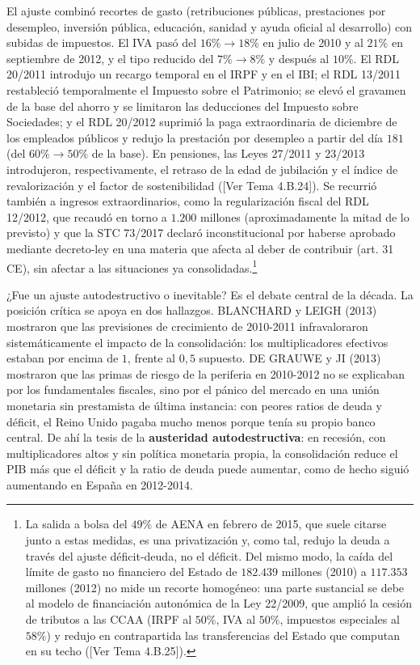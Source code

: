 \documentclass[10pt,a4paper]{article}
\newcommand{\authorfont}[1]{{\fontfamily{EBGaramond-TLF}\selectfont #1}}
\begin{document}
El ajuste combinó recortes de gasto (retribuciones públicas, prestaciones por desempleo, inversión pública, educación, sanidad y ayuda oficial al desarrollo) con subidas de impuestos. El IVA pasó del $16\%\to18\%$ en julio de 2010 y al $21\%$ en septiembre de 2012, y el tipo reducido del $7\%\to8\%$ y después al $10\%$. El RDL 20/2011 introdujo un recargo temporal en el IRPF y en el IBI; el RDL 13/2011 restableció temporalmente el Impuesto sobre el Patrimonio; se elevó el gravamen de la base del ahorro y se limitaron las deducciones del Impuesto sobre Sociedades; y el RDL 20/2012 suprimió la paga extraordinaria de diciembre de los empleados públicos y redujo la prestación por desempleo a partir del día $181$ (del $60\%\to50\%$ de la base). En pensiones, las Leyes 27/2011 y 23/2013 introdujeron, respectivamente, el retraso de la edad de jubilación y el índice de revalorización y el factor de sostenibilidad ([\authorfont{Ver Tema 4.B.24}]). Se recurrió también a ingresos extraordinarios, como la regularización fiscal del RDL 12/2012, que recaudó en torno a $1.200$ millones (aproximadamente la mitad de lo previsto) y que la STC 73/2017 declaró inconstitucional por haberse aprobado mediante decreto-ley en una materia que afecta al deber de contribuir (art. 31 CE), sin afectar a las situaciones ya consolidadas.\footnote{La salida a bolsa del $49\%$ de AENA en febrero de 2015, que suele citarse junto a estas medidas, es una privatización y, como tal, redujo la deuda a través del ajuste déficit-deuda, no el déficit. Del mismo modo, la caída del límite de gasto no financiero del Estado de $182.439$ millones (2010) a $117.353$ millones (2012) no mide un recorte homogéneo: una parte sustancial se debe al modelo de financiación autonómica de la Ley 22/2009, que amplió la cesión de tributos a las CCAA (IRPF al $50\%$, IVA al $50\%$, impuestos especiales al $58\%$) y redujo en contrapartida las transferencias del Estado que computan en su techo ([\authorfont{Ver Tema 4.B.25}]).
}

¿Fue un ajuste autodestructivo o inevitable? Es el debate central de la década. La posición crítica se apoya en dos hallazgos. BLANCHARD y LEIGH (2013) mostraron que las previsiones de crecimiento de 2010-2011 infravaloraron sistemáticamente el impacto de la consolidación: los multiplicadores efectivos estaban por encima de $1$, frente al $0,5$ supuesto. DE GRAUWE y JI (2013) mostraron que las primas de riesgo de la periferia en 2010-2012 no se explicaban por los fundamentales fiscales, sino por el pánico del mercado en una unión monetaria sin prestamista de última instancia: con peores ratios de deuda y déficit, el Reino Unido pagaba mucho menos porque tenía su propio banco central. De ahí la tesis de la \textbf{austeridad autodestructiva}: en recesión, con multiplicadores altos y sin política monetaria propia, la consolidación reduce el PIB más que el déficit y la ratio de deuda puede aumentar, como de hecho siguió aumentando en España en 2012-2014.
\end{document}

